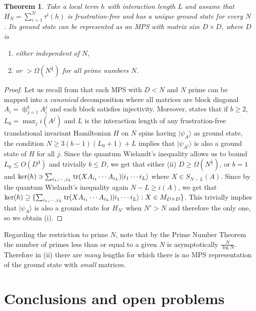 \documentclass[journal,twoside]{IEEEtran}
\newtheorem{theorem}{Theorem}
\newcommand{\1}{\mathbbm{1}}
\renewcommand{\>}{\rangle}
\newcommand{\<}{\langle}
\begin{document}
\begin{theorem}
Take a local term $h$ with interaction length $L$ and assume that
$H_N=\sum_{i=1}^N \tau^i(h)$ is frustration-free and has a unique
ground state for every $N$. Its ground state can be represented as
an MPS with matrix size $D\times D$, where $D$ is
\begin{enumerate}
\item[(i)] either independent of $N$, \item[(ii)] or
$>\Omega(N^{\frac{1}{5}})$ for all prime numbers $N$.
\end{enumerate}
\end{theorem}
\begin{proof}
Let us recall from \cite[Theorem 5]{PVWC07} that each MPS with $D<N$
and $N$ prime can be mapped into a {\it canonical} decomposition
where all matrices are block diagonal $A_i=\oplus_{j=1}^b A_i^j$ and
each block satisfies injectivity. Moreover, \cite[Theorem
11]{PVWC07} states that if $b\ge 2$, $L_0=\max_j i(A^j)$ and $L$ is
the interaction length of any frustration-free translational
invariant Hamiltonian $H$ on $N$ spins having $|\psi_A\>$ as ground
state, the condition $N\ge 3(b-1)(L_0+1)+L$ implies that
$|\psi_{A^j}\>$ is also a ground state of $H$ for all $j$. Since the
quantum Wielandt's inequality allows us to bound $L_0\le O(D^4)$ and
trivially $b\le D$, we get that either (ii) $D\ge \Omega(N^\frac{1}{5})$,
or $b=1$ and $\ker(h)\ni \sum_{i_1,\cdots, i_L}{\rm
tr}(XA_{i_1}\cdots A_{i_L})|i_1\cdots i_L\>$ where $X\in
S_{N-L}(A)$. Since by the quantum Wielandt's inequality again
$N-L\ge i(A)$, we get that $\ker(h)\supseteq \{\sum_{i_1,\cdots,
i_L}{\rm tr}(XA_{i_1}\cdots A_{i_L})|i_1\cdots i_L\>: X\in
M_{D\times D}\}$. This trivially implies that $|\psi_A\>$ is also a
ground state for $H_{N'}$ when $N'>N$ and therefore the only one, so we
obtain (i).
\end{proof}

Regarding the restriction to prime $N$, note that by the Prime
Number Theorem the number of primes less than or equal to a given
$N$ is asymptotically $\frac{N}{\log N}$. Therefore in (ii) there are {\it many} lengths for which there is no MPS representation of the ground state with {\it small} matrices.


\section{Conclusions and open problems}
\end{document}
